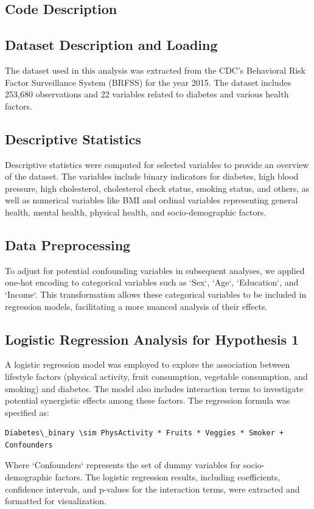 \documentclass[11pt]{article}
\begin{document}
\subsection{Code Description}

\subsection{Dataset Description and Loading}
The dataset used in this analysis was extracted from the CDC's Behavioral Risk Factor Surveillance System (BRFSS) for the year 2015. The dataset includes 253,680 observations and 22 variables related to diabetes and various health factors. 

\subsection{Descriptive Statistics}
Descriptive statistics were computed for selected variables to provide an overview of the dataset. The variables include binary indicators for diabetes, high blood pressure, high cholesterol, cholesterol check status, smoking status, and others, as well as numerical variables like BMI and ordinal variables representing general health, mental health, physical health, and socio-demographic factors.

\subsection{Data Preprocessing}
To adjust for potential confounding variables in subsequent analyses, we applied one-hot encoding to categorical variables such as `Sex`, `Age`, `Education`, and `Income`. This transformation allows these categorical variables to be included in regression models, facilitating a more nuanced analysis of their effects.

\subsection{Logistic Regression Analysis for Hypothesis 1}
A logistic regression model was employed to explore the association between lifestyle factors (physical activity, fruit consumption, vegetable consumption, and smoking) and diabetes. The model also includes interaction terms to investigate potential synergistic effects among these factors. The regression formula was specified as:
\begin{verbatim}
Diabetes\_binary \sim PhysActivity * Fruits * Veggies * Smoker + Confounders
\end{verbatim}
Where `Confounders` represents the set of dummy variables for socio-demographic factors. The logistic regression results, including coefficients, confidence intervals, and p-values for the interaction terms, were extracted and formatted for visualization.
\end{document}
